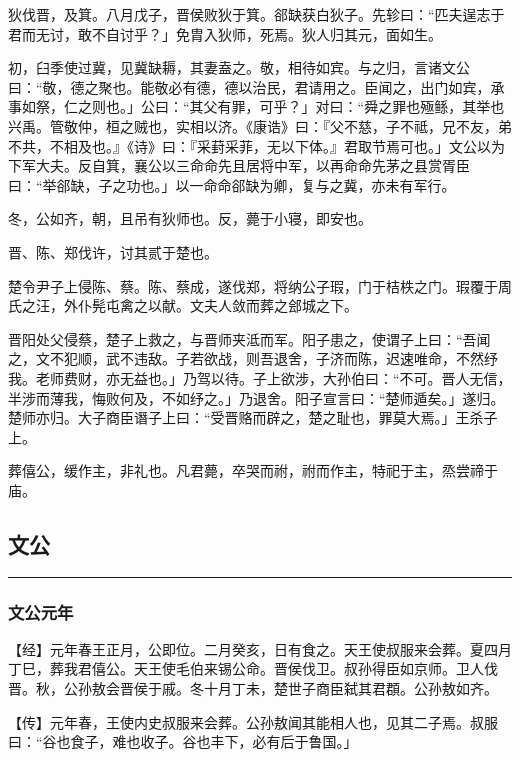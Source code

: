 \documentclass[]{article}
\begin{document}
狄伐晋，及箕。八月戊子，晋侯败狄于箕。郤缺获白狄子。先轸曰：``匹夫逞志于君而无讨，敢不自讨乎？」免胄入狄师，死焉。狄人归其元，面如生。

初，臼季使过冀，见冀缺耨，其妻盍之。敬，相待如宾。与之归，言诸文公曰：``敬，德之聚也。能敬必有德，德以治民，君请用之。臣闻之，出门如宾，承事如祭，仁之则也。」公曰：``其父有罪，可乎？」对曰：``舜之罪也殛鲧，其举也兴禹。管敬仲，桓之贼也，实相以济。《康诰》曰：『父不慈，子不祗，兄不友，弟不共，不相及也。』《诗》曰：『采葑采菲，无以下体。』君取节焉可也。」文公以为下军大夫。反自箕，襄公以三命命先且居将中军，以再命命先茅之县赏胥臣曰：``举郤缺，子之功也。」以一命命郤缺为卿，复与之冀，亦未有军行。

冬，公如齐，朝，且吊有狄师也。反，薨于小寝，即安也。

晋、陈、郑伐许，讨其贰于楚也。

楚令尹子上侵陈、蔡。陈、蔡成，遂伐郑，将纳公子瑕，门于桔柣之门。瑕覆于周氏之汪，外仆髡屯禽之以献。文夫人敛而葬之郐城之下。

晋阳处父侵蔡，楚子上救之，与晋师夹泜而军。阳子患之，使谓子上曰：``吾闻之，文不犯顺，武不违敌。子若欲战，则吾退舍，子济而陈，迟速唯命，不然纾我。老师费财，亦无益也。」乃驾以待。子上欲涉，大孙伯曰：``不可。晋人无信，半涉而薄我，悔败何及，不如纾之。」乃退舍。阳子宣言曰：``楚师遁矣。」遂归。楚师亦归。大子商臣谮子上曰：``受晋赂而辟之，楚之耻也，罪莫大焉。」王杀子上。

葬僖公，缓作主，非礼也。凡君薨，卒哭而祔，祔而作主，特祀于主，烝尝禘于庙。

\hypertarget{header-n1046}{%
\subsection{文公}\label{header-n1046}}

\begin{center}\rule{0.5\linewidth}{\linethickness}\end{center}

\hypertarget{header-n1048}{%
\subsubsection{文公元年}\label{header-n1048}}

【经】元年春王正月，公即位。二月癸亥，日有食之。天王使叔服来会葬。夏四月丁巳，葬我君僖公。天王使毛伯来锡公命。晋侯伐卫。叔孙得臣如京师。卫人伐晋。秋，公孙敖会晋侯于戚。冬十月丁未，楚世子商臣弑其君頵。公孙敖如齐。

【传】元年春，王使内史叔服来会葬。公孙敖闻其能相人也，见其二子焉。叔服曰：``谷也食子，难也收子。谷也丰下，必有后于鲁国。」
\end{document}
